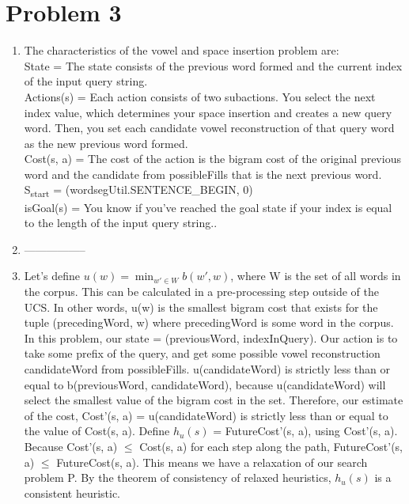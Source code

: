 \documentclass[12pt]{article}
\begin{document}
\section*{Problem 3}

\begin{enumerate}[label=(\alph*)]
  \item The characteristics of the vowel and space insertion problem are: \\
  State = The state consists of the previous word formed and the current index of the input query string. \\
  Actions(s) =  Each action consists of two subactions. You select the next index value, which determines your space insertion and creates a new query word. Then, you set each candidate vowel reconstruction of that query word as the new previous word formed.  \\
  Cost(s, a) =  The cost of the action is the bigram cost of the original previous word and the candidate from possibleFills that is the next previous word.  \\
  S\textsubscript{start} = (wordsegUtil.SENTENCE\_BEGIN, 0)\\
  isGoal(s) = You know if you've reached the goal state if your index is equal to the length of the input query string..
  
  \item -----------------
  \item Let's define $u(w) = \min_{w' \in W}b(w', w)$, where W is the set of all words in the corpus. This can be calculated in a pre-processing step outside of the UCS. In other words, u(w) is the smallest bigram cost that exists for the tuple (precedingWord, w) where precedingWord is some word in the corpus. In this problem, our state = (previousWord, indexInQuery). Our action is to take some prefix of the query, and get some possible vowel reconstruction candidateWord from possibleFills. u(candidateWord) is strictly less than or equal to b(previousWord, candidateWord), because u(candidateWord) will select the smallest value of the bigram cost in the set. Therefore, our estimate of the cost, Cost'(s, a) = u(candidateWord) is strictly less than or equal to the value of Cost(s, a). Define $h_u(s)$ = FutureCost'(s, a), using Cost'(s, a). Because Cost'(s, a) $\leq$ Cost(s, a) for each step along the path, FutureCost'(s, a) $\leq$ FutureCost(s, a).
  This means we have a relaxation of our search problem P. By the theorem of consistency of relaxed heuristics, $h_u(s)$ is a consistent heuristic. \\

\end{enumerate}
\end{document}
